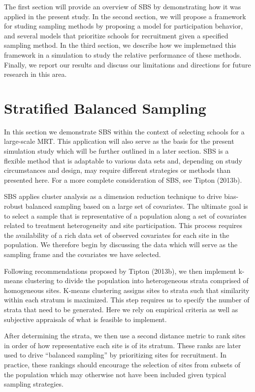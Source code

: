 \documentclass[man,floatsintext]{apa6}
\begin{document}
The first section will provide an overview of SBS by demonstrating how it was applied in the present study. In the second section, we will propose a framework for studing sampling methods by proposing a model for participation behavior, and several models that prioritize schools for recruitment given a specified sampling method. In the third section, we describe how we implemetned this framework in a simulation to study the relative performance of these methods. Finally, we report our results and discuss our limitations and directions for future research in this area.

\hypertarget{stratified-balanced-sampling}{%
\section{Stratified Balanced Sampling}\label{stratified-balanced-sampling}}

In this section we demonstrate SBS within the context of selecting schools for a large-scale MRT. This application will also serve as the basis for the present simulation study which will be further outlined in a later section. SBS is a flexible method that is adaptable to various data sets and, depending on study circumstances and design, may require different strategies or methods than presented here. For a more complete consideration of SBS, see Tipton (2013b).

SBS applies cluster analysis as a dimension reduction technique to drive bias-robust balanced sampling based on a large set of covariates. The ultimate goal is to select a sample that is representative of a population along a set of covariates related to treatment heterogeneity and site participation. This process requires the availability of a rich data set of observed covariates for each site in the population. We therefore begin by discussing the data which will serve as the sampling frame and the covariates we have selected.

Following recommendations proposed by Tipton (2013b), we then implement k-means clustering to divide the population into heterogeneous strata comprised of homogeneous sites. K-means clustering assigns sites to strata such that similarity within each stratum is maximized. This step requires us to specify the number of strata that need to be generated. Here we rely on empirical criteria as well as subjective appraisals of what is feasible to implement.

After determining the strata, we then use a second distance metric to rank sites in order of how representative each site is of its stratum. These ranks are later used to drive \enquote{balanced sampling} by prioritizing sites for recruitment. In practice, these rankings should encourage the selection of sites from subsets of the population which may otherwise not have been included given typical sampling strategies.
\end{document}
